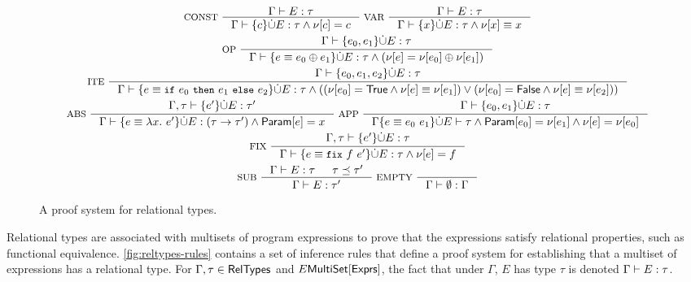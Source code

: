 \begin{figure}
  \centering
  \begin{gather*}
    \inference[ CONST ]{ %
      \Gamma \judges E : \tau }{ %
      \Gamma \judges \elts{ c } \disjunion E : %
      \tau \land \resvar{c} = c }
    \inference[ VAR ]{ %
      \Gamma \judges E : \tau }{ %
      \Gamma \judges \elts{ x } \disjunion E : %
      \tau \land \resvar{x} \equiv x } \\
    \inference[ OP ]{ 
      \Gamma \judges %
      \elts{ e_0, e_1 } \disjunion E : \tau }{ %
      \Gamma \judges \elts{ e \equiv e_0 \oplus e_1 } \disjunion E : %
      \tau \land (\resvar{e} = \resvar{e_0} \oplus \resvar{e_1}) } \\
    \inference[ ITE ]{ %
      \Gamma \judges %
      \elts{ e_0, e_1, e_2 } \disjunion E : \tau }{ %
      \Gamma \judges \disjadd{ %
        e \equiv \ite{ e_0 }{ e_1 }{ e_2 } }{ E } : %
      \tau \land ((\resvar{e_0} = \true \land %
      \resvar{e} \equiv \resvar{e_1}) \lor %
      (\resvar{e_0} = \false \land %
      \resvar{e} \equiv \resvar{e_2})) } \\
    \inference[ ABS ]{ \Gamma, \tau \judges %
      \disjadd{ e' }{ E } : \tau' }{ %
      \Gamma \judges \disjadd{ e \equiv \lambda x.\ e' }{ E } : %
      (\tau \rightarrow \tau') \land \param{ e } = x }
    \inference[ APP ]{ %
      \Gamma \judges \disjadd{ e_0, e_1 }{ E } : \tau }{ %
      \Gamma \disjadd{ e \equiv e_0\ e_1 }{ E } \judges %
      \tau \land \param{ e_0 } = \resvar{ e_1 } \land %
      \resvar{e} = \resvar{e_0} } \\
    \inference[ FIX ]{ %
      \Gamma, \tau \judges \disjadd{ e' }{ E } : \tau }{ %
      \Gamma \judges \disjadd{ e \equiv \fix{ f }{ e' } }{ E } : %
      \tau \land \resvar{e} = f } \\
    \inference[ SUB ]{ %
      \Gamma \judges E : \tau & \tau \subtype \tau'
    }{ \Gamma \judges E : \tau' } 
    \inference[ EMPTY ]{ }{ %
      \Gamma \judges \emptyset : \Gamma } %
  \end{gather*}
  \caption{A proof system for relational types.}
  \label{fig:reltypes-rules}
\end{figure}
%
%
Relational types are associated with multisets of program expressions
to prove that the expressions satisfy relational properties, such as
functional equivalence.
%
\autoref{fig:reltypes-rules} contains a set of inference rules that
define a proof system for establishing that a multiset of expressions
has a relational type.
%
For $\Gamma, \tau \in \mathsf{RelTypes}$ and $E \mathsf{MultiSet}[  \mathsf{Exprs}  ]$, the fact
that under $\Gamma$, $E$ has type $\tau$ is denoted $\Gamma \vdash E
: \tau$.

